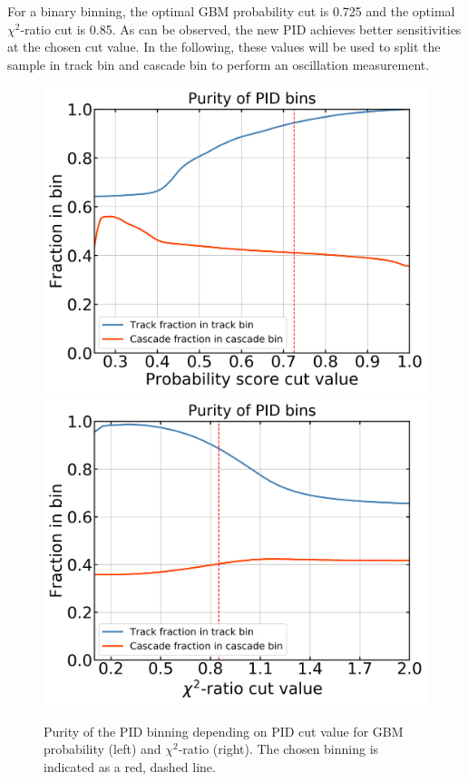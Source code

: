 For a binary binning, the optimal GBM probability cut is 0.725 and the optimal $\chi^2$-ratio cut is 0.85.
As can be observed, the new PID achieves better sensitivities at the chosen cut value.
In the following, these values will be used to split the sample in track bin and cascade bin to perform an oscillation measurement.

\begin{figure}[h!]
    \centering
    \includegraphics[width=0.49\linewidth]{figures/classifier_2_bin_contaminations.png}
    \includegraphics[width=0.49\linewidth]{figures/santa_2_bin_contaminations.png}
    \caption[Purity of the PID binning depending on PID cut value]
    {Purity of the PID binning depending on PID cut value for GBM probability (left) and  $\chi^2$-ratio (right). The chosen binning is indicated as a red, dashed line.}
    \label{fig:optimizing_two_bins_purity}
\end{figure}

